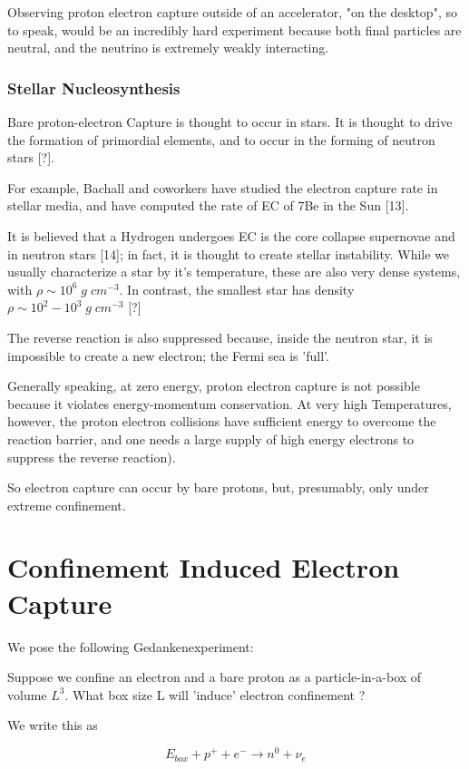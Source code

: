 \documentclass[11pt]{amsart}
\begin{document}
Observing proton electron capture outside of an accelerator, "on the desktop", so to speak, would be an incredibly hard experiment because both final particles are neutral, and  the neutrino is extremely weakly interacting.

\subsubsection{Stellar Nucleosynthesis}

Bare proton-electron Capture is thought to occur in stars.  It is thought to drive the formation of primordial elements, and to occur in the forming of neutron stars [?].

For example, Bachall and coworkers have studied the electron capture rate in stellar media, and have computed the rate of EC of 7Be in the Sun [13].

It is believed that a Hydrogen undergoes EC is the core collapse supernovae and in neutron stars [14]; in fact, it is thought to create stellar instability. While we usually characterize a star by it's temperature, these are also very dense systems, with $\rho\sim 10^6\;g\;cm^{-3}$.  In contrast, the smallest star has density $\rho\sim 10^{2}-10^{3}\;g\;cm^{-3}$ [?]

The reverse reaction is also suppressed because, inside the neutron star, it is impossible to create a new electron; the Fermi sea is 'full'.

Generally speaking, at zero energy, proton electron capture is not possible because it violates energy-momentum conservation.
At very high Temperatures, however, the proton electron collisions have sufficient energy to overcome the reaction barrier, and one needs a large supply of high energy electrons to suppress the reverse reaction).

So electron capture can occur by bare protons, but, presumably, only under extreme confinement.

\section{Confinement Induced Electron Capture}

We pose the following Gedankenexperiment:  

Suppose we confine an electron and a bare proton as a particle-in-a-box of volume $L^3$.  What box size L will 'induce' electron confinement ?

We write this as

$$E_{box}+p^{+}+e^{-}\rightarrow n^{0}+\nu_{e}$$
\end{document}
